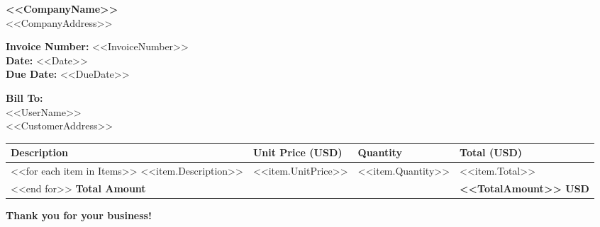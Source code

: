 \documentclass[12pt]{article}
\begin{document}
    \begin{flushright}
        \textbf{<<CompanyName>>} \\
        <<CompanyAddress>> \\
    \end{flushright}

    \begin{flushleft}
        \textbf{Invoice Number:} <<InvoiceNumber>> \\
        \textbf{Date:} <<Date>> \\
        \textbf{Due Date:} <<DueDate>> \\
    \end{flushleft}

    \vspace{0.5cm}

    \begin{flushleft}
        \textbf{Bill To:} \\
        <<UserName>> \\
        <<CustomerAddress>> \\
    \end{flushleft}

    \vspace{0.5cm}

    \begin{tabular}{| >{\raggedright}p{8cm} | >{\raggedleft}p{2.5cm} | >{\raggedleft}p{2.5cm} | >{\raggedleft\arraybackslash}p{3cm} |}
        \hline
        \textbf{Description} & \textbf{Unit Price (USD)} & \textbf{Quantity} & \textbf{Total (USD)} \\
        \hline
        <<for each item in Items>>  %
        <<item.Description>> & <<item.UnitPrice>> & <<item.Quantity>> & <<item.Total>> \\
        <<end for>>  %
        \hline
        \textbf{Total Amount} & & & \textbf{<<TotalAmount>> USD} \\
        \hline
    \end{tabular}

    \vspace{1cm}

    \textbf{Thank you for your business!}
\end{document}
